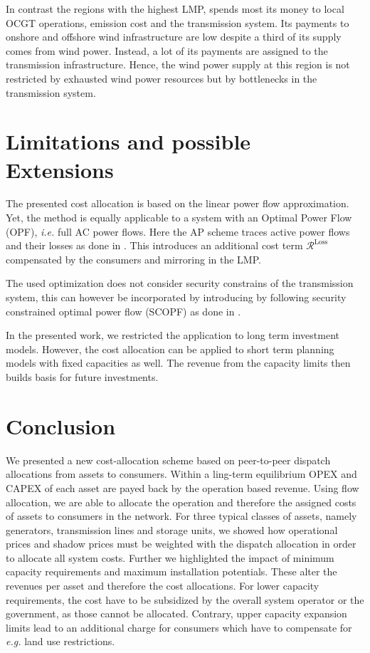 \documentclass[11pt,twocolumn]{article}
\newcommand{\ie}{\textit{i.e.} }
\newcommand{\eg}{\textit{e.g.} }
\newcommand{\remainingcost}{\mathcal{R}}
\begin{document}
In contrast the regions with the highest LMP, spends most its money to local OCGT operations, emission cost and the transmission system. Its payments to  onshore and offshore wind infrastructure are low despite a third of its supply comes from wind power. Instead, a lot of its payments are assigned to the transmission infrastructure. Hence, the wind power supply at this region is not restricted by exhausted wind power resources but by bottlenecks in the transmission system.  

 
\section{Limitations and possible Extensions}

The presented cost allocation is based on the linear power flow approximation. Yet, the method is equally applicable to a system with an Optimal Power Flow (OPF), \ie full AC power flows. Here the AP scheme traces active power flows and their losses as done in \cite{meng_investigation_2007}. This introduces an additional cost term $\remainingcost^\text{Loss}$ compensated by the consumers and mirroring in the LMP. 

The used optimization does not consider security constrains of the transmission system, this can however be incorporated by introducing by following security constrained optimal power flow (SCOPF) as done in \cite{nikoukar_transmission_2012}. 

In the presented work, we restricted the application to long term investment models. However, the cost allocation can be applied to short term planning models with fixed capacities as well. The revenue from the capacity limits then builds basis for future investments.  


\section{Conclusion}

We presented a new cost-allocation scheme based on peer-to-peer dispatch allocations from assets to consumers. Within a ling-term equilibrium OPEX and CAPEX of each asset are payed back by the operation based revenue. Using flow allocation, we are able to allocate the operation and therefore the assigned costs of assets to consumers in the network. For three typical classes of assets, namely generators, transmission lines and storage units, we showed how operational prices and shadow prices must be weighted with the dispatch allocation in order to allocate all system costs. Further we highlighted the impact of minimum capacity requirements and maximum installation potentials. These alter the revenues per asset and therefore the cost allocations. For lower capacity requirements, the cost have to be subsidized by the overall system operator or the government, as those cannot be allocated. Contrary, upper capacity expansion limits lead to an additional charge for consumers which have to compensate for \eg land use restrictions.  
\end{document}
